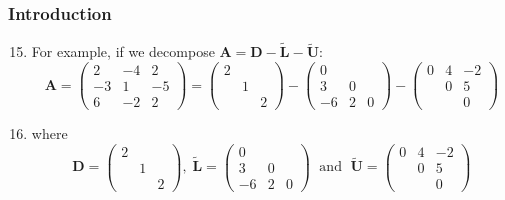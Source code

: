 \documentclass[10pt,compress]{beamer}
\begin{document}
\begin{frame}
  \frametitle{Introduction} 
  \begin{enumerate}
  \setcounter{enumi}{14}
     \item <1-> For example, if we decompose $\bm{A} = \bm{D} - \tilde{\bm{L}} -\tilde{\bm{U}}$:
        \begin{displaymath}
          \bm{A}=\begin{pmatrix} 2 & -4 & 2 \\ -3 & 1 & -5 \\ 6 & -2 & 2\end{pmatrix} = \begin{pmatrix}2 &  & \\ & 1 & \\ & & 2 \end{pmatrix} - \begin{pmatrix}0 &  & \\ 3 & 0 & \\ -6 & 2 & 0 \end{pmatrix} - \begin{pmatrix} 0 & 4 & -2 \\ & 0 & 5 \\ & & 0 \end{pmatrix}
         \end{displaymath}
     \item <2-> where 
         \begin{displaymath}
          \bm{D}=\begin{pmatrix}2 &  & \\ & 1 & \\ & & 2 \end{pmatrix},\;\tilde{\bm{L}} = \begin{pmatrix}0 &  & \\ 3 & 0 & \\ -6 & 2 & 0 \end{pmatrix} \;\text{ and }\;\tilde{\bm{U}} = \begin{pmatrix} 0 & 4 & -2 \\ & 0 & 5 \\ & & 0 \end{pmatrix}
          \end{displaymath}
  \end{enumerate}
\end{frame}
\end{document}
